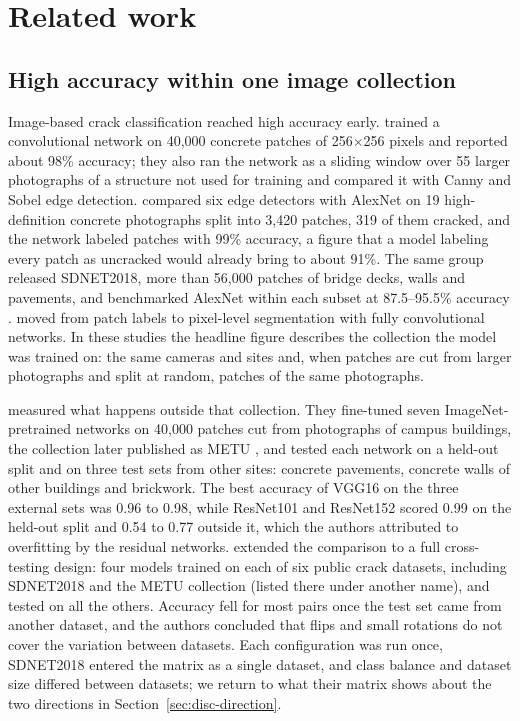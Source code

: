 \documentclass[pdflatex,sn-apa]{sn-jnl}
\begin{document}
\section{Related work}\label{sec:related}

\subsection{High accuracy within one image collection}\label{sec:related-crack}

Image-based crack classification reached high accuracy early. \citet{cha2017} trained a convolutional network on 40,000 concrete patches of 256$\times$256 pixels and reported about 98\% accuracy; they also ran the network as a sliding window over 55 larger photographs of a structure not used for training and compared it with Canny and Sobel edge detection. \citet{dorafshan2018comparison} compared six edge detectors with AlexNet on 19 high-definition concrete photographs split into 3,420 patches, 319 of them cracked, and the network labeled patches with 99\% accuracy, a figure that a model labeling every patch as uncracked would already bring to about 91\%. The same group released SDNET2018, more than 56,000 patches of bridge decks, walls and pavements, and benchmarked AlexNet within each subset at 87.5--95.5\% accuracy \citep{dorafshan2018sdnet}. \citet{alipour2019} moved from patch labels to pixel-level segmentation with fully convolutional networks. In these studies the headline figure describes the collection the model was trained on: the same cameras and sites and, when patches are cut from larger photographs and split at random, patches of the same photographs.

\citet{ozgenel2018} measured what happens outside that collection. They fine-tuned seven ImageNet-pretrained networks on 40,000 patches cut from photographs of campus buildings, the collection later published as METU \citep{ozgenel2019metu}, and tested each network on a held-out split and on three test sets from other sites: concrete pavements, concrete walls of other buildings and brickwork. The best accuracy of VGG16 on the three external sets was 0.96 to 0.98, while ResNet101 and ResNet152 scored 0.99 on the held-out split and 0.54 to 0.77 outside it, which the authors attributed to overfitting by the residual networks. \citet{rashid2025} extended the comparison to a full cross-testing design: four models trained on each of six public crack datasets, including SDNET2018 and the METU collection (listed there under another name), and tested on all the others. Accuracy fell for most pairs once the test set came from another dataset, and the authors concluded that flips and small rotations do not cover the variation between datasets. Each configuration was run once, SDNET2018 entered the matrix as a single dataset, and class balance and dataset size differed between datasets; we return to what their matrix shows about the two directions in Section~\ref{sec:disc-direction}.
\end{document}
